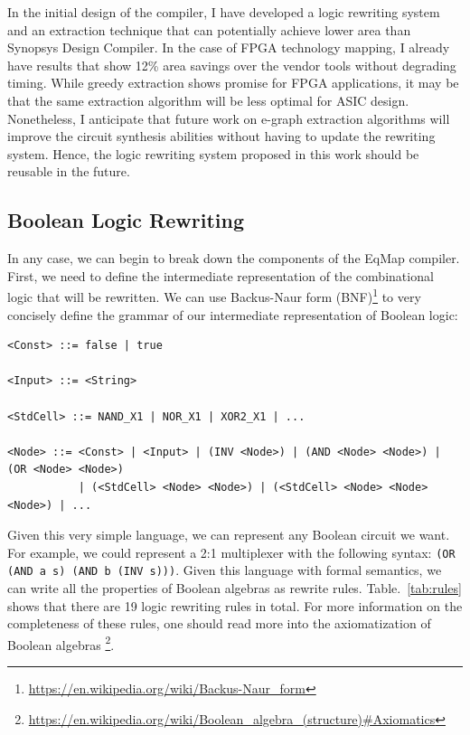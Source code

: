 \documentclass[10pt,letterpaper]{article}
\newcommand{\shortname}{EqMap}
\begin{document}
In the initial design of the compiler, I have developed a logic rewriting
system and an extraction technique that can potentially achieve lower area than
Synopsys Design Compiler. In the case of FPGA technology mapping, I already
have results that show 12\% area savings over the vendor tools without
degrading timing. While greedy extraction shows promise for FPGA applications,
it may be that the same extraction algorithm will be less optimal for ASIC
design. Nonetheless, I anticipate that future work on e-graph extraction
algorithms will improve the circuit synthesis abilities without having to
update the rewriting system. Hence, the logic rewriting system proposed in this
work should be reusable in the future.

\subsection{Boolean Logic Rewriting}\label{sec:baseline:rewriting}
In any case, we can begin to break down the components of the \shortname{}
compiler. First, we need to define the intermediate representation of the
combinational logic that will be rewritten. We can use Backus-Naur form
(BNF)\footnote{\href{https://en.wikipedia.org/wiki/Backus\%E2\%80\%93Naur\_form}{https://en.wikipedia.org/wiki/Backus-Naur\_form}}
to very concisely define the grammar of our intermediate representation of
Boolean logic:

\begin{verbatim}
<Const> ::= false | true

<Input> ::= <String>

<StdCell> ::= NAND_X1 | NOR_X1 | XOR2_X1 | ...

<Node> ::= <Const> | <Input> | (INV <Node>) | (AND <Node> <Node>) | (OR <Node> <Node>)
           | (<StdCell> <Node> <Node>) | (<StdCell> <Node> <Node> <Node>) | ...
\end{verbatim}

Given this very simple language, we can represent any Boolean circuit we want.
For example, we could represent a 2:1 multiplexer with the following syntax:
\texttt{(OR (AND a s) (AND b (INV s)))}. Given this language with formal
semantics, we can write all the properties of Boolean algebras as rewrite
rules. Table.~\ref{tab:rules} shows that there are 19 logic rewriting rules in
total. For more information on the completeness of these rules, one should read
more into the axiomatization of Boolean algebras
\footnote{\href{https://en.wikipedia.org/wiki/Boolean\_algebra\_(structure)\#Axiomatics}{https://en.wikipedia.org/wiki/Boolean\_algebra\_(structure)\#Axiomatics}}.
\end{document}
